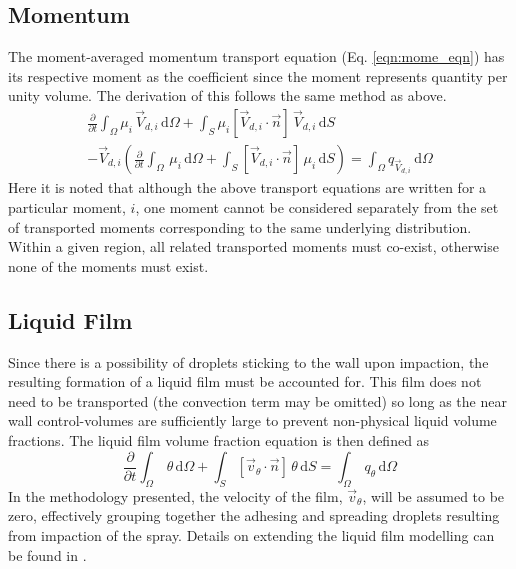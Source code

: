 \documentclass[a4paper,10pt]{article}
\begin{document}
\subsection{Momentum}
The moment-averaged momentum transport equation (Eq. \ref{eqn:mome_eqn}) has its respective moment as the coefficient since the moment represents quantity per unity volume. The derivation of this follows the same method as above.
\begin{multline} \label{eqn:mome_eqn}
\frac{\partial}{\partial t} \int_{\Omega} \mu_{i} \,\vec{V}_{d,i}\, \mathrm{d} \Omega
+ \int_{S} \mu_{i} [\vec{V}_{d,i} \cdot \vec{n}] \,\vec{V}_{d,i}\, \mathrm{d} S \\
- \vec{V}_{d,i} \left( \frac{\partial}{\partial t} \int_{\Omega} \,\mu_{i}\, \mathrm{d} \Omega
+ \int_{S} [\vec{V}_{d,i} \cdot \vec{n}] \,\mu_{i}\, \mathrm{d} S \right)
= \int_{\Omega} q_{\vec{V}_{d,i}}\, \mathrm{d} \Omega
\end{multline}
Here it is noted that although the above transport equations are written for a particular moment, $i$, one moment cannot be considered separately from the set of transported moments corresponding to the same underlying distribution. Within a given region, all related transported moments must co-exist, otherwise none of the moments must exist.



\subsection{Liquid Film}
Since there is a possibility of droplets sticking to the wall upon impaction, the resulting formation of a liquid film must be accounted for.  This film does not need to be transported (the convection term may be omitted) so long as the near wall control-volumes are sufficiently large to prevent non-physical liquid volume fractions.  The liquid film volume fraction equation is then defined as
\begin{equation} \label{eqn:liqfilm_eqn}
\frac{\partial}{\partial t} \int_{\Omega} \, \theta \, \mathrm{d}\Omega
+ \int_{S} [\vec{v}_{\theta} \cdot \vec{n}] \, \theta \, \mathrm{d}S
= \int_{\Omega} \, q_{\theta} \, \mathrm{d}\Omega
\end{equation}
In the methodology presented, the velocity of the film, $\vec{v}_{\theta}$, will be assumed to be zero, effectively grouping together the adhesing and spreading droplets resulting from impaction of the spray. Details on extending the liquid film modelling can be found in \cite{stanton1998}.
\end{document}
